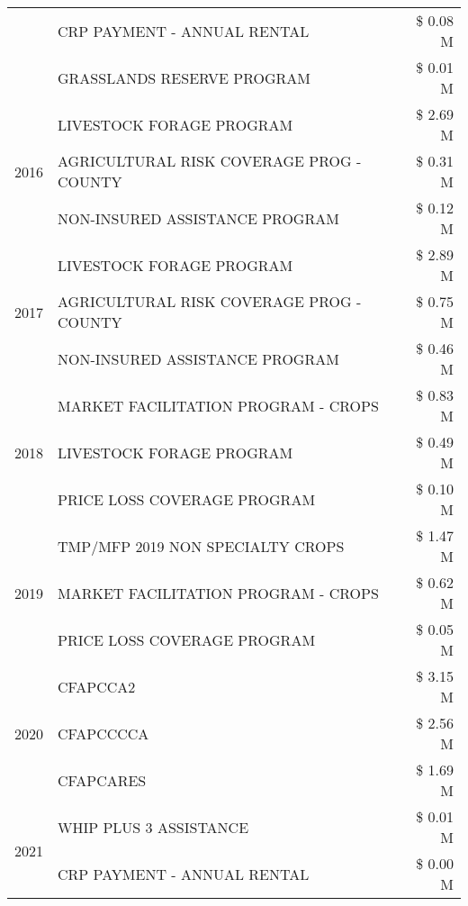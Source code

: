 \begin{tabular}{llr}
 & CRP PAYMENT - ANNUAL RENTAL & \$ 0.08 M \\
 & GRASSLANDS RESERVE PROGRAM & \$ 0.01 M \\
\cline{1-3}
\multirow[t]{3}{*}{2016} & LIVESTOCK FORAGE PROGRAM                      & \$ 2.69 M \\
 & AGRICULTURAL RISK COVERAGE PROG - COUNTY      & \$ 0.31 M \\
 & NON-INSURED ASSISTANCE PROGRAM                & \$ 0.12 M \\
\cline{1-3}
\multirow[t]{3}{*}{2017} & LIVESTOCK FORAGE PROGRAM & \$ 2.89 M \\
 & AGRICULTURAL RISK COVERAGE PROG - COUNTY & \$ 0.75 M \\
 & NON-INSURED ASSISTANCE PROGRAM & \$ 0.46 M \\
\cline{1-3}
\multirow[t]{3}{*}{2018} & MARKET FACILITATION PROGRAM - CROPS & \$ 0.83 M \\
 & LIVESTOCK FORAGE PROGRAM & \$ 0.49 M \\
 & PRICE LOSS COVERAGE PROGRAM & \$ 0.10 M \\
\cline{1-3}
\multirow[t]{3}{*}{2019} & TMP/MFP 2019 NON SPECIALTY CROPS & \$ 1.47 M \\
 & MARKET FACILITATION PROGRAM - CROPS & \$ 0.62 M \\
 & PRICE LOSS COVERAGE PROGRAM & \$ 0.05 M \\
\cline{1-3}
\multirow[t]{3}{*}{2020} & CFAPCCA2 & \$ 3.15 M \\
 & CFAPCCCCA & \$ 2.56 M \\
 & CFAPCARES & \$ 1.69 M \\
\cline{1-3}
\multirow[t]{2}{*}{2021} & WHIP PLUS 3 ASSISTANCE & \$ 0.01 M \\
 & CRP PAYMENT - ANNUAL RENTAL & \$ 0.00 M \\
\cline{1-3}
\bottomrule
\end{tabular}
